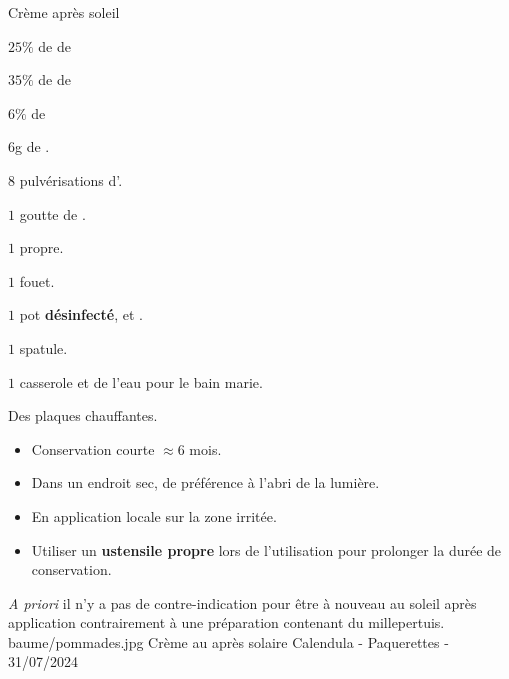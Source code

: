\label{soleilcp}
\ficherecette
{%
    Crème après soleil
}
{%
    \item $25\%$ de  de 
    \item $35\%$ de  de 
    \item $6\%$ de 
    \item $6$g de .
    \item $8$ pulvérisations d'.
    \item $1$ goutte de .
}
{%
    \item $1$  propre. 
    \item $1$ fouet. 
    \item $1$ pot \textbf{désinfecté},  et .
    \item $1$ spatule. 
    \item $1$ casserole et de l'eau pour le bain marie. 
    \item Des plaques chauffantes. 
}
{%
    \begin{itemize}[label=\faPen]
        \item Conservation courte $\approx 6$ mois.
        \item Dans un endroit sec, de préférence à l'abri de la lumière. 
    \end{itemize}
}
{%
    \begin{itemize}[label=\faPen]
        \item En application locale sur la zone irritée.
        \item Utiliser un \textbf{ustensile propre} lors de l'utilisation pour prolonger la durée de conservation. 
    \end{itemize}
}
{%
    \textit{A priori} il n'y a pas de contre-indication pour être à nouveau au soleil après application contrairement à une préparation contenant du millepertuis.
}
{%
    baume/pommades.jpg
}
{%
    Crème au après solaire
}
{%
    Calendula - Paquerettes - 31/07/2024
}